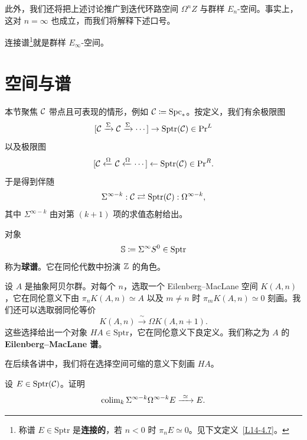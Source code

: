 此外，我们还将把上述讨论推广到迭代环路空间 $\Omega^{n}Z$ 与群样 $E_{n}$-空间。事实上，这对 $n=\infty$ 也成立，而我们将解释下述口号。

\begin{slogan}\label{L14-3.5}\centering\par
连接谱\footnote{称谱 $E\in\mathrm{Sptr}$ 是\textbf{连接的}，若 $n<0$ 时 $\pi_{n}E\simeq 0$。见下文定义~\ref{L14-4.7}。}就是群样 $E_{\infty}$-空间。
\end{slogan}


\section{空间与谱}

\nitem\label{L14-4.1} 本节聚焦 $\mathcal{C}$ 带点且可表现的情形，例如 $\mathcal{C}\coloneqq\operatorname{Spc}_{\ast}$。按定义，我们有余极限图
\[
[\mathcal{C}\xrightarrow{\Sigma}\mathcal{C}\xrightarrow{\Sigma}\cdots]\to\mathrm{Sptr}(\mathcal{C})\in\mathrm{Pr}^{L}
\]
以及极限图
\[
[\mathcal{C}\xleftarrow{\Omega}\mathcal{C}\xleftarrow{\Omega}\cdots]\leftarrow\mathrm{Sptr}(\mathcal{C})\in\mathrm{Pr}^{R}.
\]
于是得到伴随
\[
\Sigma^{\infty-k}:\mathcal{C}\rightleftarrows\mathrm{Sptr}(\mathcal{C}):\Omega^{\infty-k},
\]
其中 $\Sigma^{\infty-k}$ 由对第 $(k+1)$ 项的求值态射给出。

\begin{example}\label{L14-4.2}
对象
\[
\mathbb{S}\coloneqq\Sigma^{\infty}S^{0}\in\mathrm{Sptr}
\]
称为\textbf{球谱}。它在同伦代数中扮演 $\mathbb{Z}$ 的角色。
\end{example}

\begin{example}\label{L14-4.3}
设 $A$ 是抽象阿贝尔群。对每个 $n$，选取一个 Eilenberg--MacLane 空间 $K(A,n)$，它在同伦意义下由 $\pi_{n}K(A,n)\simeq A$ 以及 $m\neq n$ 时 $\pi_{m}K(A,n)\simeq 0$ 刻画。我们还可以选取弱同伦等价
\[
K(A,n)\xrightarrow{\ \sim\ }\Omega K(A,n+1).
\]
这些选择给出一个对象 $HA\in\mathrm{Sptr}$，它在同伦意义下良定义。我们称之为 $A$ 的\textbf{Eilenberg--MacLane 谱}。
\end{example}

\begin{remark}\label{L14-4.4}
在后续各讲中，我们将在选择空间可缩的意义下刻画 $HA$。
\end{remark}

\begin{exercise}\label{L14-4.5}
设 $E\in\mathrm{Sptr}(\mathcal{C})$。证明
\[
\colim_{k}\Sigma^{\infty-k}\Omega^{\infty-k}E\xrightarrow{\ \simeq\ }E.
\]
\end{exercise}

